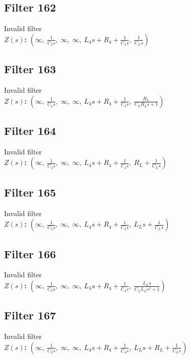 \documentclass{article}
\begin{document}
\subsection*{Filter 162}
Invalid filter \\ 
\textbf{$Z(s)$:} $\left( \infty, \  \frac{1}{C_{2} s}, \  \infty, \  \infty, \  L_{4} s + R_{4} + \frac{1}{C_{4} s}, \  \frac{1}{C_{L} s}\right)$ \\ 
\subsection*{Filter 163}
Invalid filter \\ 
\textbf{$Z(s)$:} $\left( \infty, \  \frac{1}{C_{2} s}, \  \infty, \  \infty, \  L_{4} s + R_{4} + \frac{1}{C_{4} s}, \  \frac{R_{L}}{C_{L} R_{L} s + 1}\right)$ \\ 
\subsection*{Filter 164}
Invalid filter \\ 
\textbf{$Z(s)$:} $\left( \infty, \  \frac{1}{C_{2} s}, \  \infty, \  \infty, \  L_{4} s + R_{4} + \frac{1}{C_{4} s}, \  R_{L} + \frac{1}{C_{L} s}\right)$ \\ 
\subsection*{Filter 165}
Invalid filter \\ 
\textbf{$Z(s)$:} $\left( \infty, \  \frac{1}{C_{2} s}, \  \infty, \  \infty, \  L_{4} s + R_{4} + \frac{1}{C_{4} s}, \  L_{L} s + \frac{1}{C_{L} s}\right)$ \\ 
\subsection*{Filter 166}
Invalid filter \\ 
\textbf{$Z(s)$:} $\left( \infty, \  \frac{1}{C_{2} s}, \  \infty, \  \infty, \  L_{4} s + R_{4} + \frac{1}{C_{4} s}, \  \frac{L_{L} s}{C_{L} L_{L} s^{2} + 1}\right)$ \\ 
\subsection*{Filter 167}
Invalid filter \\ 
\textbf{$Z(s)$:} $\left( \infty, \  \frac{1}{C_{2} s}, \  \infty, \  \infty, \  L_{4} s + R_{4} + \frac{1}{C_{4} s}, \  L_{L} s + R_{L} + \frac{1}{C_{L} s}\right)$ \\ 
\end{document}
